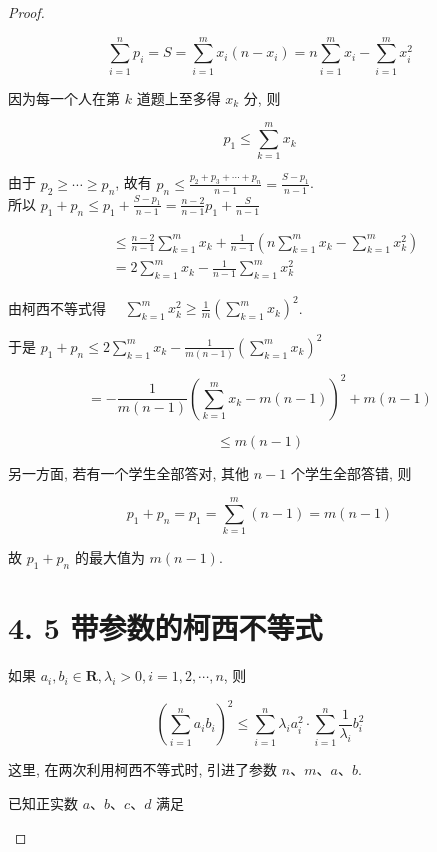 \begin{proof}
\begin{example}
\begin{solution}
\begin{note}
\begin{solution}
	$$
	\sum_{i=1}^{n} p_{i}=S=\sum_{i=1}^{m} x_{i}\left(n-x_{i}\right)=n \sum_{i=1}^{m} x_{i}-\sum_{i=1}^{m} x_{i}^{2}
	$$
	
	因为每一个人在第 $k$ 道题上至多得 $x_{k}$ 分, 则
	
	$$
	p_{1} \leqslant \sum_{k=1}^{m} x_{k}
	$$
	
	由于 $p_{2} \geqslant \cdots \geqslant p_{n}$, 故有 $p_{n} \leqslant \frac{p_{2}+p_{3}+\cdots+p_{n}}{n-1}=\frac{S-p_{1}}{n-1}$.\\
	所以 $p_{1}+p_{n} \leqslant p_{1}+\frac{S-p_{1}}{n-1}=\frac{n-2}{n-1} p_{1}+\frac{S}{n-1}$
	
	$$
	\begin{aligned}
	& \leqslant \frac{n-2}{n-1} \sum_{k=1}^{m} x_{k}+\frac{1}{n-1}\left(n \sum_{k=1}^{m} x_{k}-\sum_{k=1}^{m} x_{k}^{2}\right) \\
	& =2 \sum_{k=1}^{m} x_{k}-\frac{1}{n-1} \sum_{k=1}^{m} x_{k}^{2}
	\end{aligned}
	$$
	
	由柯西不等式得 $\quad \sum_{k=1}^{m} x_{k}^{2} \geqslant \frac{1}{m}\left(\sum_{k=1}^{m} x_{k}\right)^{2}$.
	
	于是 $p_{1}+p_{n} \leqslant 2 \sum_{k=1}^{m} x_{k}-\frac{1}{m(n-1)}\left(\sum_{k=1}^{m} x_{k}\right)^{2}$
	
	$$
	=-\frac{1}{m(n-1)}\left(\sum_{k=1}^{m} x_{k}-m(n-1)\right)^{2}+m(n-1)
	$$
	
	$$
	\leqslant m(n-1)
	$$
	
	另一方面, 若有一个学生全部答对, 其他 $n-1$ 个学生全部答错, 则
	
	$$
	p_{1}+p_{n}=p_{1}=\sum_{k=1}^{m}(n-1)=m(n-1)
	$$
	
	故 $p_{1}+p_{n}$ 的最大值为 $m(n-1)$.
	
	\section*{4. 5 带参数的柯西不等式}
	如果 $a_{i}, b_{i} \in \mathbf{R}, \lambda_{i}>0, i=1,2, \cdots, n$, 则
	
	$$
	\left(\sum_{i=1}^{n} a_{i} b_{i}\right)^{2} \leqslant \sum_{i=1}^{n} \lambda_{i} a_{i}^{2} \cdot \sum_{i=1}^{n} \frac{1}{\lambda_{i}} b_{i}^{2}
	$$
\begin{note}
	这里, 在两次利用柯西不等式时, 引进了参数 $n 、 m 、 a 、 b$.
\end{note}

\begin{example}
	已知正实数 $a 、 b 、 c 、 d$ 满足
	

\end{example}
\end{solution}
\end{note}
\end{solution}
\end{example}
\end{proof}
